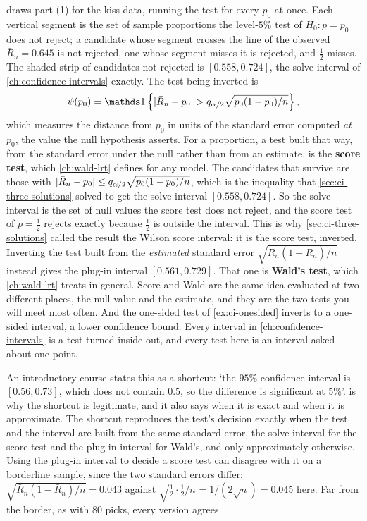  draws part (1) for the kiss data, running the test for every $p_0$ at once.
Each vertical segment is the set of sample proportions the level-$5\%$ test of $H_0: p = p_0$ does not reject; a candidate whose segment crosses the line of the observed $\bar{R}_n = 0.645$ is not rejected, one whose segment misses it is rejected, and $\frac12$ misses.
The shaded strip of candidates not rejected is $[0.558, 0.724]$, the solve interval of \cref{ch:confidence-intervals} exactly.
The test being inverted is
\[
\psi(p_0) = \ind\left\{ \abs{\bar{R}_n - p_0} > q_{\alpha/2}\sqrt{p_0(1 - p_0)/n} \right\},
\]
which measures the distance from $p_0$ in units of the standard error computed \textit{at $p_0$}, the value the null hypothesis asserts. For a proportion, a test built that way, from the standard error under the null rather than from an estimate, is the \textbf{score test}, which \cref{ch:wald-lrt} defines for any model.
The candidates that survive are those with $\lvert\bar{R}_n - p_0\rvert \leq q_{\alpha/2}\sqrt{p_0(1-p_0)/n}$, which is the inequality that \cref{sec:ci-three-solutions} solved to get the solve interval $[0.558, 0.724]$.
So the solve interval is the set of null values the score test does not reject, and the score test of $p = \frac12$ rejects exactly because $\frac12$ is outside the interval. This is why \cref{sec:ci-three-solutions} called the result the Wilson score interval: it is the score test, inverted.
Inverting the test built from the \textit{estimated} standard error $\sqrt{\bar{R}_n(1 - \bar{R}_n)/n}$ instead gives the plug-in interval $[0.561, 0.729]$. That one is \textbf{Wald's test}, which \cref{ch:wald-lrt} treats in general. Score and Wald are the same idea evaluated at two different places, the null value and the estimate, and they are the two tests you will meet most often.
And the one-sided test of \cref{ex:ci-onesided} inverts to a one-sided interval, a lower confidence bound.
Every interval in \cref{ch:confidence-intervals} is a test turned inside out, and every test here is an interval asked about one point.

\begin{bridge}
An introductory course states this as a shortcut: `the $95\%$ confidence interval is $[0.56, 0.73]$, which does not contain $0.5$, so the difference is significant at $5\%$'.
 is why the shortcut is legitimate, and it also says when it is exact and when it is approximate.
The shortcut reproduces the test's decision exactly when the test and the interval are built from the same standard error, the solve interval for the score test and the plug-in interval for Wald's, and only approximately otherwise.
Using the plug-in interval to decide a score test can disagree with it on a borderline sample, since the two standard errors differ: $\sqrt{\bar{R}_n(1 - \bar{R}_n)/n} = 0.043$ against $\sqrt{\frac12 \cdot \frac12 / n} = 1/(2\sqrt{n}) = 0.045$ here. Far from the border, as with $80$ picks, every version agrees.
\end{bridge}

